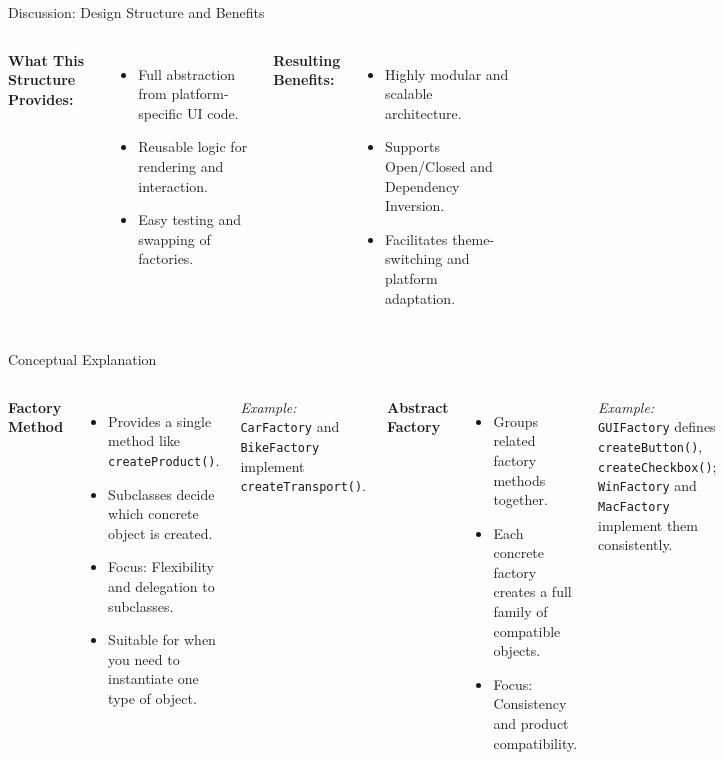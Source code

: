\documentclass[aspectratio=169, table]{beamer}
\begin{document}
\begin{frame}[fragile]{Discussion: Design Structure and Benefits}
\vspace{5pt}
\begin{columns}[T]
\textbf{What This Structure Provides:}
\begin{itemize}
\item Full abstraction from platform-specific UI code.
\item Reusable logic for rendering and interaction.
\item Easy testing and swapping of factories.
\end{itemize}

\textbf{Resulting Benefits:}
\begin{itemize}
\item Highly modular and scalable architecture.
\item Supports Open/Closed and Dependency Inversion.
\item Facilitates theme-switching and platform adaptation.
\end{itemize}
\end{columns}
\end{frame}

\begin{frame}[fragile]{Conceptual Explanation}
	\vspace{20pt}
	\begin{columns}[T]
		\textbf{Factory Method}
		\begin{itemize}
			\item Provides a single method like \texttt{createProduct()}.
			\item Subclasses decide which concrete object is created.
			\item Focus: Flexibility and delegation to subclasses.
			\item Suitable for when you need to instantiate one type of object.
		\end{itemize}
		\textit{Example:} \texttt{CarFactory} and \texttt{BikeFactory} implement \texttt{createTransport()}.
		
		\textbf{Abstract Factory}
		\begin{itemize}
			\item Groups related factory methods together.
			\item Each concrete factory creates a full family of compatible objects.
			\item Focus: Consistency and product compatibility.
		\end{itemize}
		\textit{Example:} \texttt{GUIFactory} defines \texttt{createButton()}, \texttt{createCheckbox()};  
		\texttt{WinFactory} and \texttt{MacFactory} implement them consistently.
	\end{columns}
\end{frame}
\end{document}
